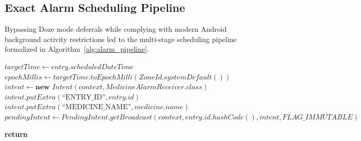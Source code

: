 \documentclass[11pt,a4paper]{article}
\begin{document}
\subsection{Exact Alarm Scheduling Pipeline}

Bypassing Doze mode deferrals while complying with modern Android background activity restrictions led to the multi-stage scheduling pipeline formalized in Algorithm~\ref{alg:alarm_pipeline}.

\begin{algorithm}[t]
\caption{Alarm Scheduling and Doze-Resistant Dispatch Pipeline}
\label{alg:alarm_pipeline}
\small
\begin{algorithmic}[1]
    \State $targetTime \gets entry.scheduledDateTime$
    \State $epochMillis \gets targetTime.toEpochMilli(ZoneId.systemDefault())$
    \State $intent \gets \textbf{new } Intent(context, MedicineAlarmReceiver.class)$
    \State $intent.putExtra(\text{``ENTRY\_ID''}, entry.id)$
    \State $intent.putExtra(\text{``MEDICINE\_NAME''}, medicine.name)$
    \State $pendingIntent \gets PendingIntent.getBroadcast(context, entry.id.hashCode(), intent, FLAG\_IMMUTABLE)$
    
            \State {}
            \State \textbf{return}
        \EndIf
    \EndIf
    

\end{algorithmic}
\end{algorithm}
\end{document}
